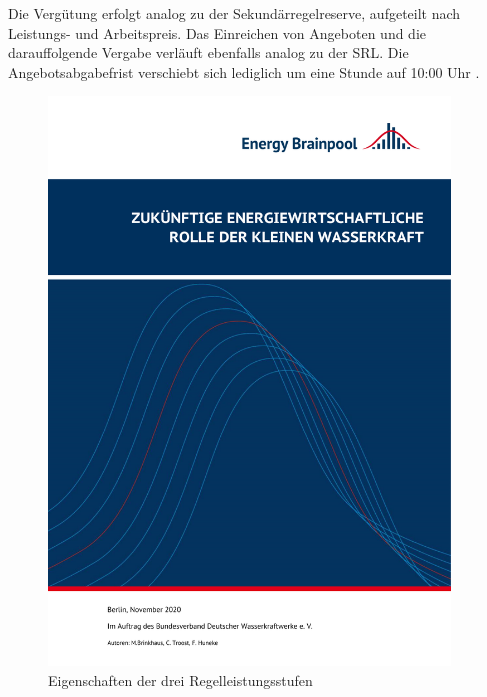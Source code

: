 			Die Vergütung erfolgt analog zu der Sekundärregelreserve, aufgeteilt nach Leistungs- und Arbeitspreis.
			Das Einreichen von Angeboten und die darauffolgende Vergabe verläuft ebenfalls analog zu der SRL.
			Die Angebotsabgabefrist verschiebt sich lediglich um eine Stunde  auf 10:00 Uhr \cite{regelleistungnet_PRL_Ausschreibung}.
			
			\begin{figure} [H]
				\centering
				\includegraphics[page=23,trim=40 340 40 130, clip, width=0.95\textwidth]{./anhang/Studie Tabelle Regelleistungen.pdf}
				\caption{Eigenschaften der drei Regelleistungsstufen \cite[S. 20]{Studie Regelleistung Wasserkraft}}
				\label{Abb. Eigenschaften der drei Regelleistungsstufen}
			\end{figure}
	
